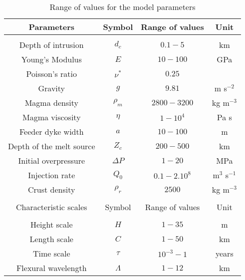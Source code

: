 \begin{table}
  \caption{Range of values for the model parameters}
  \centering
  \begin{tabular}{c|c|c|c}
    \hline
    Parameters& Symbol & Range of values &Unit\\
    \hline
              &&\\
    Depth of intrusion & $d_c$ & $0.1-5$ &km \\
    Young's Modulus & $E$ & $10-100$ &GPa \\
    Poisson's ratio & $\nu^*$ & $0.25$ &\\
    Gravity & $g$ & $9.81$ &m s$^{-2}$ \\
    Magma density & $\rho_{m}$ & $2800-3200$ &kg m$^{-3}$ \\
    Magma viscosity & $\eta $ & $1-10^{4}$ &Pa s \\
    Feeder dyke width & $a$ & $10-100$ &m \\
    Depth of the melt source & $Z_{c}$ & $ 200-500$& km \\ 
    Initial overpressure & $\Delta P$ & $1-20$ &MPa \\
    Injection rate & $Q_{0}$ &$0.1-2.10^8$ &m$^{3}$ s$^{-1}$ \\
    Crust density & $\rho_{r}$ & $2500$ &kg m$^{-3}$ \\
              &&\\
    \hline
    Characteristic scales & Symbol & Range of values & Unit\\
    \hline
              &&\\
    Height scale & $H$& $1-35$ &m \\
    Length scale & $C$    & $1-50$ &km \\
    Time scale & $\tau$ & $10^{-3}-1$ &years \\
    Flexural wavelength & $\Lambda$ & $1-12$& km 
                                              \label{tab2}
  \end{tabular} 
\end{table}
	 
